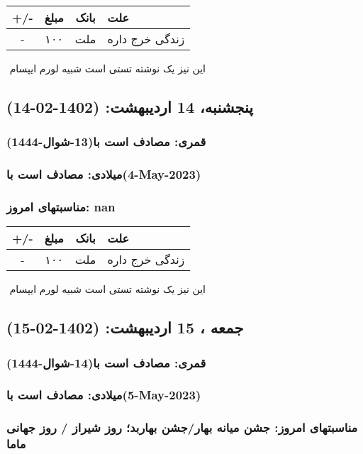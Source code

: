 \documentclass{article}
\newcommand{\rnote}[1]{\marginpar{\textcolor{color}{\StrSubstitute{\##1}{ }{\_}}}}
\newcommand{\myRow}[4]{
    #1 & #2 & #3 & #4 \\ \hline
}
\begin{document}
\begin{tabular}{ | c | c | c | p{5cm} |}
    \hline
    \myRow{ +/- }{مبلغ}{بانک}{علت}
    \myRow{-}{۱۰۰}{ملت}{زندگی خرج داره}
\end{tabular}
\newline
\newline

‌
\rnote{تست}
این نیز یک نوشته تستی است شبیه لورم ایپسام




\newpage
{}
\textcolor{color}{
\section{ پنجشنبه، 14 اردیبهشت: (1402-02-14) }
\subsubsection*{قمری: مصادف است با(13-شوال-1444)} 
\subsubsection*{میلادی: مصادف است با(4-May-2023)}
\subsubsection*{مناسبتهای امروز: nan}
}


\begin{tabular}{ | c | c | c | p{5cm} |}
    \hline
    \myRow{ +/- }{مبلغ}{بانک}{علت}
    \myRow{-}{۱۰۰}{ملت}{زندگی خرج داره}
\end{tabular}
\newline
\newline

‌
\rnote{تست}
این نیز یک نوشته تستی است شبیه لورم ایپسام




\newpage
{}
\textcolor{color}{
\section{ جمعه ، 15 اردیبهشت: (1402-02-15) }
\subsubsection*{قمری: مصادف است با(14-شوال-1444)} 
\subsubsection*{میلادی: مصادف است با(5-May-2023)}
\subsubsection*{مناسبتهای امروز: جشن میانه بهار/جشن بهاربد؛ روز شیراز / روز جهانی ماما}
}
\end{document}
